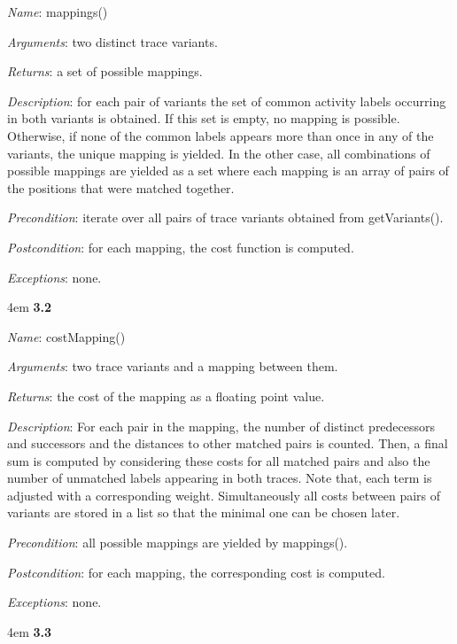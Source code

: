 \documentclass[notitlepage]{article}
\begin{document}
\begin{flushleft}
\textit{Name}: mappings()

\textit{Arguments}: two distinct trace variants.

\textit{Returns}: a set of possible mappings.

\textit{Description}: for each pair of variants the set of common activity labels occurring in both variants is obtained. If this set is empty, no mapping is possible. Otherwise, if none of the common labels appears more than once in any of the variants, the unique mapping is yielded. In the other case, all combinations of possible mappings are yielded as a set where each mapping is an array of pairs of the positions that were matched together.

\textit{Precondition}: iterate over all pairs of trace variants obtained from getVariants().

\textit{Postcondition}: for each mapping, the cost function is computed.

\textit{Exceptions}: none.
\par
\endgroup


\medskip

\par
\begingroup
\leftskip4em
\textbf{3.2} 

\textit{Name}: costMapping()

\textit{Arguments}: two trace variants and a mapping between them.

\textit{Returns}: the cost of the mapping as a floating point value.

\textit{Description}: For each pair in the mapping, the number of distinct predecessors and successors and the distances to other matched pairs is counted. Then, a final sum is computed by considering these costs for all matched pairs and also the number of unmatched labels appearing in both traces. Note that, each term is adjusted with a corresponding weight. Simultaneously all costs between pairs of variants are stored in a list so that the minimal one can be chosen later.

\textit{Precondition}: all possible mappings are yielded by mappings().

\textit{Postcondition}: for each mapping, the corresponding cost is computed.

\textit{Exceptions}: none.
\par
\endgroup


\medskip

\par
\begingroup
\leftskip4em
\textbf{3.3} 


\end{flushleft}
\end{document}
